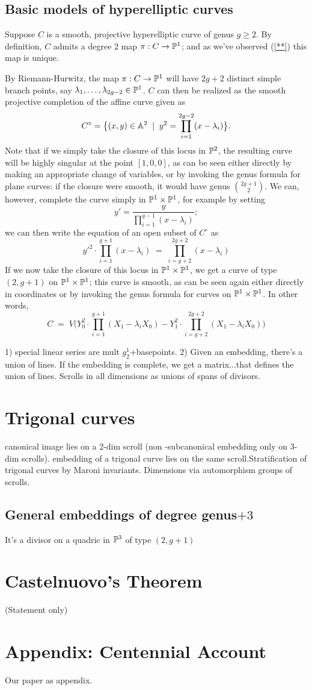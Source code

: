 \subsection{Basic models of hyperelliptic curves}

Suppose $C$ is a smooth, projective hyperelliptic curve of genus $g \geq 2$. By definition, $C$ admits a degree 2 map $\pi : C \to \PP^1$; and as we've observed (\ref{**}) this map is unique.

By Riemann-Hurwitz, the map $\pi : C \to \PP^1$ will have $2g+2$ distinct simple branch points, say $\lambda_1,\dots,\lambda_{2g-2} \in \PP^1$. $C$ can then be realized as the smooth projective completion of the affine curve given as
$$
C^\circ = \big\{ (x,y) \in \AA^2 \; \mid \; y^2 = \prod_{i=1}^{2g-2} (x - \lambda_i) \big\}.
$$ 
Note that if we simply take the closure of this locus in $\PP^2$, the resulting curve will be highly singular at the point $[1,0,0]$, as can be seen either  directly by making an appropriate change of variables, or by invoking the genus formula for plane curves: if the closure were smooth, it would have genus $\binom{2g+1}{2}$. We can, however, complete the curve simply in $\PP^1 \times \PP^1$, for example by setting
$$
y' = \frac{y}{\prod_{i=1}^{g-1} (x - \lambda_i)};
$$
we can then write the equation of an open subset of $C^\circ$ as
$$
{y'}^2 \cdot \prod_{i=1}^{g+1} (x - \lambda_i) \; = \; \prod_{i=g+2}^{2g+2} (x - \lambda_i)
$$
If we now take the closure of this locus in $\PP^1 \times \PP^1$, we get a curve of type $(2,g+1)$ on $\PP^1 \times \PP^1$; this curve is smooth, as can be seen again either directly in coordinates or by invoking the genus formula for curves on $\PP^1 \times \PP^1$. In other words,
$$
C \; = \; V\Big(Y_0^2\cdot \prod_{i=1}^{g+1} (X_1 - \lambda_iX_0) - Y_1^2 \cdot \prod_{i=g+2}^{2g+2} (X_1 - \lambda_iX_0) \Big)
$$


 1) special linear series are mult $g^1_2$+basepoints. 2) Given an embedding, there's a union of lines. If the embedding is complete, we get a matrix...that defines the union of lines. Scrolls in all dimensions as unions of spans of divisors.

\section{Trigonal curves}
canonical image lies on a 2-dim scroll (non -subcanonical embedding only on 3-dim scrolls).  embedding of a trigonal curve lies on the same scroll.Stratification of trigonal curves by Maroni invariants. Dimensions via automorphism groups of scrolls.

\subsection{General embeddings of degree
genus$+3$} 

It's a divisor on a quadric in $\PP^{3}$ of type $(2,g+1)$

\section{Castelnuovo's Theorem}
(Statement only)

\section{Appendix: Centennial Account}
Our paper as appendix.
